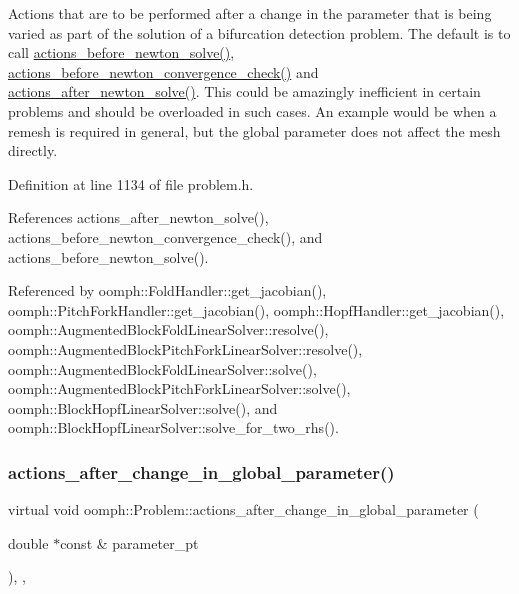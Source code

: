 Actions that are to be performed after a change in the parameter that is being varied as part of the solution of a bifurcation detection problem. The default is to call \hyperlink{classoomph_1_1Problem_a0c8d70891f7369bb4bf8412fa1a08ecb}{actions\+\_\+before\+\_\+newton\+\_\+solve()}, \hyperlink{classoomph_1_1Problem_ae6ad96ddf5d48b517b89c9a9b879bc4b}{actions\+\_\+before\+\_\+newton\+\_\+convergence\+\_\+check()} and \hyperlink{classoomph_1_1Problem_a033ec7301123deeb7e56d04c38f9f1da}{actions\+\_\+after\+\_\+newton\+\_\+solve()}. This could be amazingly inefficient in certain problems and should be overloaded in such cases. An example would be when a remesh is required in general, but the global parameter does not affect the mesh directly. 



Definition at line 1134 of file problem.\+h.



References actions\+\_\+after\+\_\+newton\+\_\+solve(), actions\+\_\+before\+\_\+newton\+\_\+convergence\+\_\+check(), and actions\+\_\+before\+\_\+newton\+\_\+solve().



Referenced by oomph\+::\+Fold\+Handler\+::get\+\_\+jacobian(), oomph\+::\+Pitch\+Fork\+Handler\+::get\+\_\+jacobian(), oomph\+::\+Hopf\+Handler\+::get\+\_\+jacobian(), oomph\+::\+Augmented\+Block\+Fold\+Linear\+Solver\+::resolve(), oomph\+::\+Augmented\+Block\+Pitch\+Fork\+Linear\+Solver\+::resolve(), oomph\+::\+Augmented\+Block\+Fold\+Linear\+Solver\+::solve(), oomph\+::\+Augmented\+Block\+Pitch\+Fork\+Linear\+Solver\+::solve(), oomph\+::\+Block\+Hopf\+Linear\+Solver\+::solve(), and oomph\+::\+Block\+Hopf\+Linear\+Solver\+::solve\+\_\+for\+\_\+two\+\_\+rhs().

\mbox{\label{classoomph_1_1Problem_a1e90bbe5d279295b97ae704487259bcc}} 
\subsubsection{\texorpdfstring{actions\+\_\+after\+\_\+change\+\_\+in\+\_\+global\+\_\+parameter()}{actions\_after\_change\_in\_global\_parameter()}}
{\footnotesize\ttfamily virtual void oomph\+::\+Problem\+::actions\+\_\+after\+\_\+change\+\_\+in\+\_\+global\+\_\+parameter (\begin{DoxyParamCaption}\item[{double $\ast$const \&}]{parameter\+\_\+pt }\end{DoxyParamCaption})\hspace{0.3cm}{\ttfamily [inline]}, {\ttfamily [protected]}, {\ttfamily [virtual]}}



